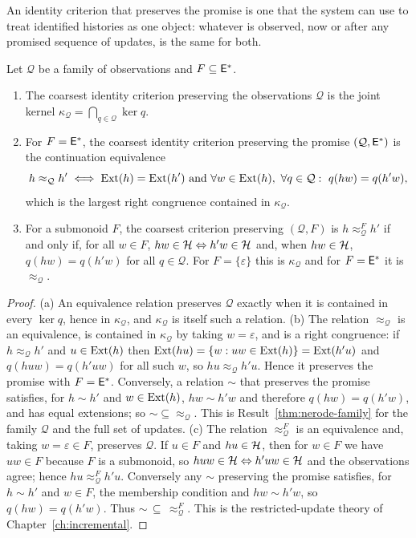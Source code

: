 An identity criterion that preserves the promise is one that the system can use to treat identified histories as one object: whatever is observed, now or after any promised sequence of updates, is the same for both.

\begin{newresult}\label{thm:identity}
Let $\mathcal Q$ be a family of observations and $F\subseteq\mathsf{E}^{*}$.
\begin{enumerate}[nosep,label=(\alph*)]
  \item The coarsest identity criterion preserving the observations $\mathcal Q$ is the joint kernel $\kappa_{\mathcal Q}=\bigcap_{q\in\mathcal Q}\ker q$.
  \item For $F=\mathsf{E}^{*}$, the coarsest identity criterion preserving the promise $(\mathcal Q,\mathsf{E}^{*})$ is the continuation equivalence
  \[
  h\approx_{\mathcal Q}h'\iff \operatorname{Ext}(h)=\operatorname{Ext}(h')\text{ and }\forall w\in\operatorname{Ext}(h),\ \forall q\in\mathcal Q:\ q(hw)=q(h'w),
  \]
  which is the largest right congruence contained in $\kappa_{\mathcal Q}$.
  \item For a submonoid $F$, the coarsest criterion preserving $(\mathcal Q,F)$ is $h\approx^{F}_{\mathcal Q}h'$ if and only if, for all $w\in F$, $hw\in\mathcal{H}\Leftrightarrow h'w\in\mathcal{H}$ and, when $hw\in\mathcal{H}$, $q(hw)=q(h'w)$ for all $q\in\mathcal Q$. For $F=\{\varepsilon\}$ this is $\kappa_{\mathcal Q}$ and for $F=\mathsf{E}^{*}$ it is $\approx_{\mathcal Q}$.
\end{enumerate}
\end{newresult}
\begin{proof}
(a) An equivalence relation preserves $\mathcal Q$ exactly when it is contained in every $\ker q$, hence in $\kappa_{\mathcal Q}$, and $\kappa_{\mathcal Q}$ is itself such a relation. (b) The relation $\approx_{\mathcal Q}$ is an equivalence, is contained in $\kappa_{\mathcal Q}$ by taking $w=\varepsilon$, and is a right congruence: if $h\approx_{\mathcal Q}h'$ and $u\in\operatorname{Ext}(h)$ then $\operatorname{Ext}(hu)=\{w:uw\in\operatorname{Ext}(h)\}=\operatorname{Ext}(h'u)$ and $q(huw)=q(h'uw)$ for all such $w$, so $hu\approx_{\mathcal Q}h'u$. Hence it preserves the promise with $F=\mathsf{E}^{*}$. Conversely, a relation $\sim$ that preserves the promise satisfies, for $h\sim h'$ and $w\in\operatorname{Ext}(h)$, $hw\sim h'w$ and therefore $q(hw)=q(h'w)$, and has equal extensions; so $\sim\subseteq\approx_{\mathcal Q}$. This is Result~\ref{thm:nerode-family} for the family $\mathcal Q$ and the full set of updates. (c) The relation $\approx^{F}_{\mathcal Q}$ is an equivalence and, taking $w=\varepsilon\in F$, preserves $\mathcal Q$. If $u\in F$ and $hu\in\mathcal{H}$, then for $w\in F$ we have $uw\in F$ because $F$ is a submonoid, so $huw\in\mathcal{H}\Leftrightarrow h'uw\in\mathcal{H}$ and the observations agree; hence $hu\approx^{F}_{\mathcal Q}h'u$. Conversely any $\sim$ preserving the promise satisfies, for $h\sim h'$ and $w\in F$, the membership condition and $hw\sim h'w$, so $q(hw)=q(h'w)$. Thus $\sim\,\subseteq\,\approx^{F}_{\mathcal Q}$. This is the restricted-update theory of Chapter~\ref{ch:incremental}.
\end{proof}

